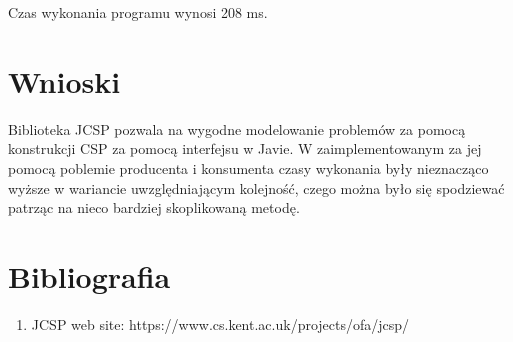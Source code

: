 \documentclass{article}
\begin{document}
Czas wykonania programu wynosi 208 ms.

\section{Wnioski}

Biblioteka JCSP pozwala na wygodne modelowanie problemów za pomocą konstrukcji CSP za pomocą interfejsu
w Javie. W zaimplementowanym za jej pomocą poblemie producenta i konsumenta czasy wykonania były 
nieznacząco wyższe w wariancie uwzględniającym kolejność, czego można było się spodziewać patrząc
na nieco bardziej skoplikowaną metodę.

\section{Bibliografia}

\begin{enumerate}
    \item
    JCSP web site: https://www.cs.kent.ac.uk/projects/ofa/jcsp/
\end{enumerate}
\end{document}
